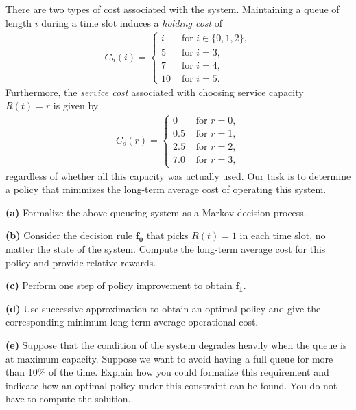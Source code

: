 \documentclass{article}
\begin{document}
\noindent
There are two types of cost associated with the system.
Maintaining a queue of length $i$ during a time slot induces a \textit{holding cost} of 
\begin{align*}
    C_h(i) = \begin{cases}
        i & \text{ for } i \in \{ 0, 1, 2 \}, \\
        5 & \text{ for } i = 3, \\
        7 & \text{ for } i = 4, \\
        10 & \text{ for } i = 5. 
    \end{cases}
\end{align*}
Furthermore, the \textit{service cost} associated with choosing service capacity $R(t) = r$ is given by
\begin{align*}
    C_s(r) = \begin{cases}
        0 & \text{ for } r = 0 , \\
        0.5 & \text{ for } r = 1 , \\
        2.5 & \text{ for } r = 2 , \\
        7.0 & \text{ for } r = 3 ,
    \end{cases}
\end{align*}
regardless of whether all this capacity was actually used.
Our task is to determine a policy that minimizes the long-term average cost of operating this system.

\vspace{1em}
\noindent
\textbf{(a)}
Formalize the above queueing system as a Markov decision process.

\vspace{1em}
\noindent
\textbf{(b)}
Consider the decision rule $\mathbf{f_0}$ that picks $R(t) = 1$ in each time slot, no matter the state of the system.
Compute the long-term average cost for this policy and provide relative rewards.


\vspace{1em}
\noindent
\textbf{(c)}
Perform one step of policy improvement to obtain $\mathbf{f_1}$.

\vspace{1em}
\noindent
\textbf{(d)}
Use successive approximation to obtain an optimal policy and give the corresponding minimum long-term average operational cost.

\vspace{1em}
\noindent
\textbf{(e)}
Suppose that the condition of the system degrades heavily when the queue is at maximum capacity.
Suppose we want to avoid having a full queue for more than 10\% of the time.
Explain how you could formalize this requirement and indicate how an optimal policy under this constraint can be found.
You do not have to compute the solution.
\end{document}
